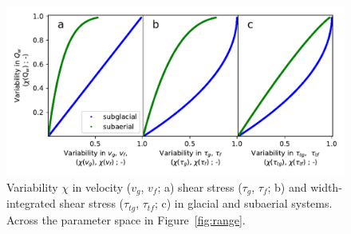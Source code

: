 \documentclass[draft]{agujournal2019}
\begin{document}
\renewcommand{\figurename}{Figure S}
\setcounter{figure}{0}

\begin{center}
  \begin{figure}[H]
    \includegraphics[width=0.7\linewidth]{multi_run_vars.pdf}
    \caption{Variability $\chi$ in velocity ($v_g$, $v_f$; a) shear stress ($\tau_g$, $\tau_f$; b) and width-integrated shear stress ($\tau_{tg}$, $\tau_{tf}$; c)  in glacial and subaerial systems. Across the parameter space in Figure~\ref{fig:range}. }
    \label{fig:gammas}
  \end{figure}
\end{center}
\end{document}
